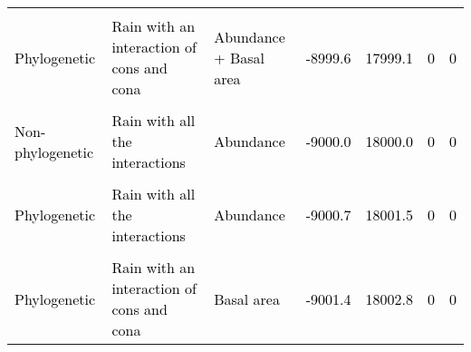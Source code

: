 \documentclass[
  12pt,
  letterpaper,
  DIV=11,
  numbers=noendperiod]{scrartcl}
\begin{document}
\begin{table}[H]
{\begin{tabular}[t]{lllllll}
\cellcolor{gray!6}{\textcolor{black}{Non-phylogenetic}} & \cellcolor{gray!6}{\textcolor{black}{Rain with an interaction of cons and cona}} & \cellcolor{gray!6}{\textcolor{black}{Abundance + Basal area}} & \cellcolor{gray!6}{\textcolor{black}{-8998.8}} & \cellcolor{gray!6}{\textcolor{black}{17997.5}} & \cellcolor{gray!6}{\textcolor{black}{0}} & \cellcolor{gray!6}{\textcolor{black}{0}}\\
\textcolor{black}{Phylogenetic} & \textcolor{black}{Rain with an interaction of cons and cona} & \textcolor{black}{Abundance + Basal area} & \textcolor{black}{-8999.6} & \textcolor{black}{17999.1} & \textcolor{black}{0} & \textcolor{black}{0}\\
\cellcolor{gray!6}{\textcolor{black}{Phylogenetic}} & \cellcolor{gray!6}{\textcolor{black}{Rain with an interaction of cona}} & \cellcolor{gray!6}{\textcolor{black}{Basal area}} & \cellcolor{gray!6}{\textcolor{black}{-8999.9}} & \cellcolor{gray!6}{\textcolor{black}{17999.7}} & \cellcolor{gray!6}{\textcolor{black}{0}} & \cellcolor{gray!6}{\textcolor{black}{0}}\\
\textcolor{black}{Non-phylogenetic} & \textcolor{black}{Rain with all the interactions} & \textcolor{black}{Abundance} & \textcolor{black}{-9000.0} & \textcolor{black}{18000.0} & \textcolor{black}{0} & \textcolor{black}{0}\\
\addlinespace
\cellcolor{gray!6}{\textcolor{black}{Non-phylogenetic}} & \cellcolor{gray!6}{\textcolor{black}{Rain with an interaction of cona}} & \cellcolor{gray!6}{\textcolor{black}{Basal area}} & \cellcolor{gray!6}{\textcolor{black}{-9000.1}} & \cellcolor{gray!6}{\textcolor{black}{18000.3}} & \cellcolor{gray!6}{\textcolor{black}{0}} & \cellcolor{gray!6}{\textcolor{black}{0}}\\
\textcolor{black}{Phylogenetic} & \textcolor{black}{Rain with all the interactions} & \textcolor{black}{Abundance} & \textcolor{black}{-9000.7} & \textcolor{black}{18001.5} & \textcolor{black}{0} & \textcolor{black}{0}\\
\cellcolor{gray!6}{\textcolor{black}{Non-phylogenetic}} & \cellcolor{gray!6}{\textcolor{black}{Rain with an interaction of cons and cona}} & \cellcolor{gray!6}{\textcolor{black}{Basal area}} & \cellcolor{gray!6}{\textcolor{black}{-9001.1}} & \cellcolor{gray!6}{\textcolor{black}{18002.2}} & \cellcolor{gray!6}{\textcolor{black}{0}} & \cellcolor{gray!6}{\textcolor{black}{0}}\\
\textcolor{black}{Phylogenetic} & \textcolor{black}{Rain with an interaction of cons and cona} & \textcolor{black}{Basal area} & \textcolor{black}{-9001.4} & \textcolor{black}{18002.8} & \textcolor{black}{0} & \textcolor{black}{0}\\

\end{tabular}}
\end{table}
\end{document}

